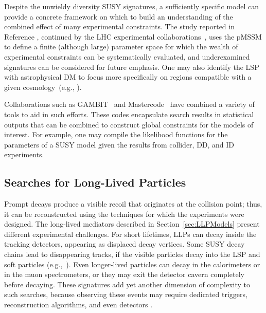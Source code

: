 \documentclass{ar-1col}
\begin{document}
{Despite the unwieldy diversity SUSY signatures, a sufficiently
specific model can provide a concrete framework on which to build
an understanding of the combined effect of many experimental
constraints. The study reported in Reference , continued by the LHC
experimental collaborations~\cite{Aad:2015baa, Khachatryan:2016nvf}, uses the
pMSSM to define a finite (although large) parameter space for
which the wealth of experimental constraints can be systematically
evaluated, and underexamined signatures can be considered for future emphasis.
One may also identify the LSP with astrophysical DM
to focus more specifically on regions compatible with a given
cosmology~(e.g., ).

Collaborations such as GAMBIT~\cite{Athron:2017ard} and
Mastercode~\cite{Bagnaschi:2017tru} have combined a variety of
tools to aid in such efforts. These codes encapsulate search
results in statistical outputs that can be combined to construct
global constraints for the models of interest. For example, one
may compile the likelihood functions for the parameters of a SUSY
model given the results from collider, DD, and ID experiments.

\subsection{Searches for Long-Lived Particles}\label{sec:results_LLPSearches}

Prompt decays produce a visible recoil that originates at the collision
point; thus, it can be reconstructed using the techniques for
which the experiments were designed. The long-lived mediators
described in Section~\ref{sec:LLPModels} present different
experimental challenges. For short lifetimes, LLPs can decay inside the tracking detectors, appearing as
displaced decay vertices. Some SUSY decay chains lead to
disappearing tracks, if the visible particles decay into the LSP
and soft particles (e.g.,~).
Even longer-lived particles can decay in the calorimeters or in
the muon spectrometers, or they may exit the detector cavern
completely before decaying. 
These signatures add yet another
dimension of complexity to such searches, because observing these
events may require dedicated triggers, reconstruction algorithms,
and even detectors \cite{Ball:2016zrp,Chou:2016lxi}.

}
\end{document}
